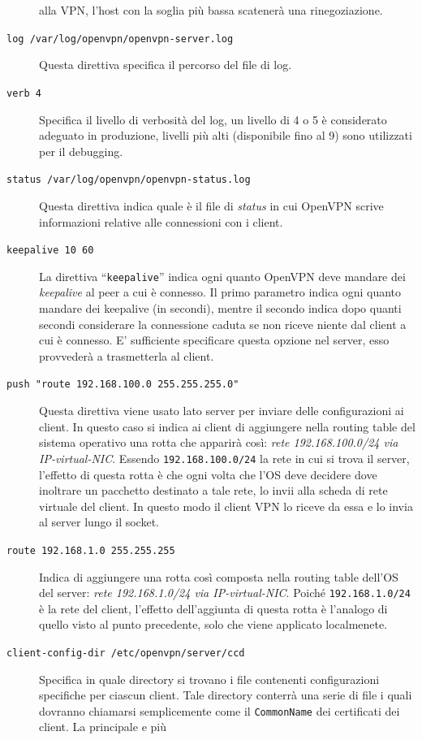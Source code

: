 \begin{description}
	alla VPN, l'host con la soglia più bassa scatenerà una rinegoziazione.
	\item[\texttt{log /var/log/openvpn/openvpn-server.log}]Questa direttiva specifica
	il percorso del file di log.
	\item[\texttt{verb 4}]Specifica il livello di verbosità del log, un livello di
	4 o 5 è considerato adeguato in produzione, livelli più alti (disponibile fino al 9)
	sono utilizzati per il debugging.
	\item[\texttt{status /var/log/openvpn/openvpn-status.log}]Questa direttiva indica
	quale è il file di \textit{status} in cui OpenVPN scrive informazioni relative
	alle connessioni con i client.
	\item[\texttt{keepalive 10 60}]La direttiva ``\texttt{keepalive}'' indica ogni
	quanto OpenVPN deve mandare dei \textit{keepalive} al peer a cui è connesso.
	Il primo parametro indica ogni quanto mandare dei keepalive (in secondi), mentre
	il secondo indica dopo quanti secondi considerare la connessione caduta se non riceve
	niente dal client a cui è connesso. E' sufficiente specificare questa opzione
	nel server, esso provvederà a trasmetterla al client.
	\item[\texttt{push "route 192.168.100.0 255.255.255.0"}]Questa direttiva viene
	usato lato server per inviare delle configurazioni ai client. In questo caso si indica
	ai client di aggiungere nella routing table del sistema operativo una rotta che
	apparirà così: \textit{rete 192.168.100.0/24 via IP-virtual-NIC}. Essendo
	\texttt{192.168.100.0/24} la rete in cui si trova il server, l'effetto di questa
	rotta è che ogni volta che l'OS deve decidere dove inoltrare un
	pacchetto destinato a tale rete, lo invii alla scheda di rete virtuale
	del client. In questo modo il client VPN lo riceve da essa e lo invia al server
	lungo il socket.
	\item[\texttt{route 192.168.1.0 255.255.255}]Indica di aggiungere una rotta
	così composta nella routing table dell'OS del server: \textit{rete 192.168.1.0/24
		via IP-virtual-NIC}. Poiché \texttt{192.168.1.0/24} è la rete del client, l'effetto
	dell'aggiunta di questa rotta è l'analogo di quello visto al punto precedente, solo che
	viene applicato localmenete.
	\item[\texttt{client-config-dir /etc/openvpn/server/ccd}]Specifica in quale
	directory si trovano i file contenenti configurazioni specifiche per ciascun client.
	Tale directory conterrà una serie di file i quali dovranno chiamarsi semplicemente
	come il \texttt{CommonName} dei certificati dei client. La principale e più

\end{description}
